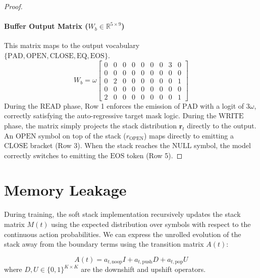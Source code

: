 \documentclass[11pt]{article}
\newcommand{\bm}{\mathbf}
\begin{document}
\begin{proof}
\paragraph{Buffer Output Matrix ($W_b \in \mathbb{R}^{5 \times 9}$)}
This matrix maps to the output vocabulary \\ $\{\text{PAD}, \text{OPEN}, \text{CLOSE}, \text{EQ}, \text{EOS}\}$.
\begin{equation}
W_b = \omega \begin{bmatrix}
0 & 0 & 0 & 0 & 0 & 0 & 0 & 3 & 0 \\
0 & 0 & 0 & 0 & 0 & 0 & 0 & 0 & 0 \\
0 & 2 & 0 & 0 & 0 & 0 & 0 & 0 & 1 \\
0 & 0 & 0 & 0 & 0 & 0 & 0 & 0 & 0 \\
2 & 0 & 0 & 0 & 0 & 0 & 0 & 0 & 1
\end{bmatrix}
\end{equation}
During the $\text{READ}$ phase, Row 1 enforces the emission of $\text{PAD}$ with a logit of $3\omega$, correctly satisfying the auto-regressive target mask logic. During the $\text{WRITE}$ phase, the matrix simply projects the stack distribution $\bm{r}_t$ directly to the output. An $\text{OPEN}$ symbol on top of the stack ($r_{\text{OPEN}}$) maps directly to emitting a $\text{CLOSE}$ bracket (Row 3). When the stack reaches the $\text{NULL}$ symbol, the model correctly switches to emitting the $\text{EOS}$ token (Row 5).
\end{proof}



\section{Memory Leakage}

During training, the soft stack implementation recursively updates the stack matrix $M(t)$ using the expected distribution over symbols with respect to the continuous action probabilities. We can express the unrolled evolution of the stack away from the boundary terms using the transition matrix $A(t)$:

\begin{equation}
A(t) = a_{t,\text{noop}}I + a_{t,\text{push}}D + a_{t,\text{pop}}U
\end{equation}
where $D, U \in \{0,1\}^{K \times K}$ are the downshift and upshift operators.
\end{document}
